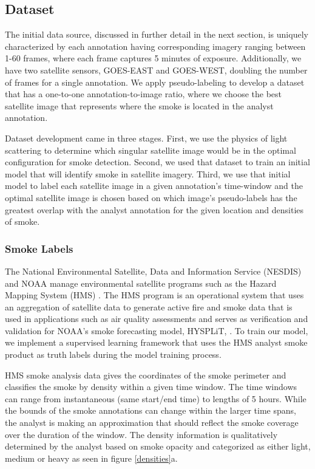\documentclass{article}
\begin{document}
\subsection*{Dataset}

The initial data source, discussed in further detail in the next section, is uniquely characterized by each annotation having corresponding imagery ranging between 1-60 frames, where each frame captures 5 minutes of exposure.  Additionally, we have two satellite sensors, GOES-EAST and GOES-WEST, doubling the number of frames for a single annotation. We apply pseudo-labeling to develop a dataset that has a one-to-one annotation-to-image ratio, where we choose the best satellite image that represents where the smoke is located in the analyst annotation.

Dataset development came in three stages. First, we use the physics of light scattering to determine which singular satellite image would be in the optimal configuration for smoke detection. Second, we used that dataset to train an initial model that will identify smoke in satellite imagery. Third, we use that initial model to label each satellite image in a given annotation's time-window and the optimal satellite image is chosen based on which image's pseudo-labels has the greatest overlap with the analyst annotation for the given location and densities of smoke.

\subsubsection*{Smoke Labels} 
The National Environmental Satellite, Data and Information Service (NESDIS) and NOAA manage environmental satellite programs such as the Hazard Mapping System (HMS) \citep{hms, hms_val}. The HMS program is an operational system that uses an aggregation of satellite data to generate active fire and smoke data that is used in applications such as air quality assessments and serves as verification and validation for NOAA's smoke forecasting model, HYSPLiT, \citep{hysplit_ver}. To train our model, we implement a supervised learning framework that uses the HMS analyst smoke product as truth labels during the model training process.

HMS smoke analysis data gives the coordinates of the smoke perimeter and classifies the smoke by density within a given time window. The time windows can range from instantaneous (same start/end time) to lengths of 5 hours. While the bounds of the smoke annotations can change within the larger time spans, the analyst is making an approximation that should reflect the smoke coverage over the duration of the window. The density information is qualitatively determined by the analyst based on smoke opacity and categorized as either light, medium or heavy as seen in figure \ref{densities}a.
\end{document}
